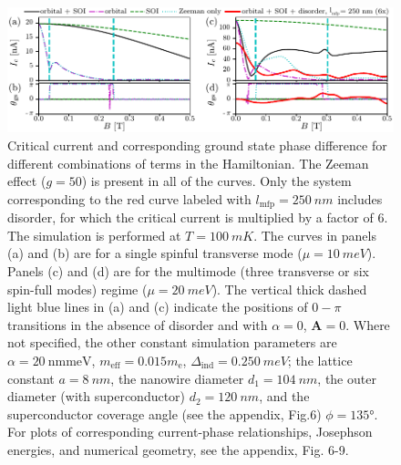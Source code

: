 \begin{figure}[t]
\includegraphics[width=\textwidth]{chapter_supercurrent/figures/fig4.pdf}
\caption{Critical current and corresponding ground state phase difference for different combinations of terms in the Hamiltonian.
The Zeeman effect ($g=50$) is present in all of the curves.
Only the system corresponding to the red curve labeled with $l_\textrm{mfp}=\SI{250}{nm}$ includes disorder, for which the critical current is multiplied by a factor of 6. The simulation is performed at $T=\SI{100}{mK}$.
The curves in panels (a) and (b) are for a single spinful transverse mode ($\mu=\SI{10}{meV}$).
Panels (c) and (d) are for the multimode (three transverse or six spin-full modes) regime ($\mu=\SI{20}{meV}$).
The vertical thick dashed light blue lines in (a) and (c) indicate the positions of $0-\pi$ transitions in the absence of disorder and with $\alpha = 0$, $\mathbf{A}=0$.
Where not specified, the other constant simulation parameters are $\alpha=\SI{20}{\nm \meV}$, $m_\textrm{eff}=0.015 m_\textrm{e}$, $\Delta_\textrm{ind}=\SI{0.250}{meV}$; the lattice constant $a=\SI{8}{nm}$, the nanowire diameter $d_1=\SI{104}{nm}$, the outer diameter (with superconductor) $d_2=\SI{120}{nm}$, and the superconductor coverage angle (see the appendix, Fig.6) $\phi=135\si{\degree}$. For plots of corresponding current-phase relationships, Josephson energies, and numerical geometry, see the appendix, Fig. 6-9.
}
\label{fig:critical_currents}
\end{figure}

